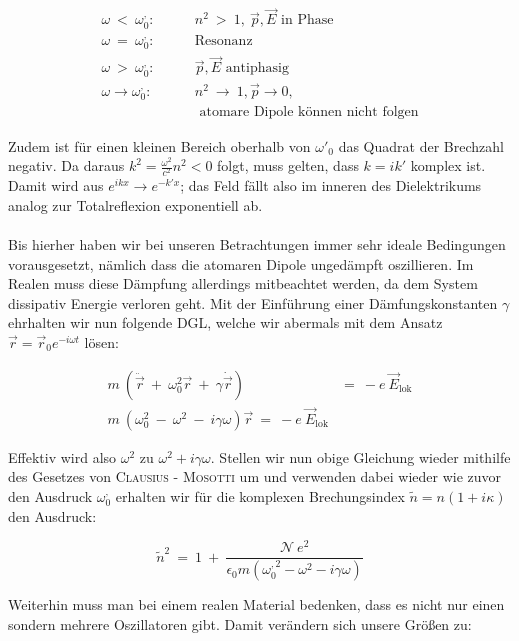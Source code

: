 \begin{align*}
\omega \ < \ \omega^{,}_0:& \qquad n^2 \ > \ 1,\ \vec{p},\vec{E} \text{ in Phase}\\
\omega \ = \ \omega^{,}_0:& \qquad \text{Resonanz}\\
\omega \ > \ \omega^{,}_0:& \qquad \vec{p},\vec{E} \text{ antiphasig}\\
\omega \rightarrow \omega^{,}_0:& \qquad n^2 \ \rightarrow \ 1, \vec{p} \rightarrow 0,\\
 & \qquad \text{ atomare Dipole können nicht  folgen}
\end{align*}

Zudem ist für einen kleinen Bereich oberhalb von $\omega'_0$ das Quadrat der Brechzahl negativ. Da daraus $k^2 = \frac{\omega^2}{c^2} n^2 < 0$ folgt, muss gelten, dass $k=ik'$ komplex ist. Damit wird aus $e^{ikx} \rightarrow e^{-k'x}$; das Feld fällt also im inneren des Dielektrikums analog zur Totalreflexion exponentiell ab.\\
\ \\
Bis hierher haben wir bei unseren Betrachtungen immer sehr ideale Bedingungen vorausgesetzt, nämlich dass die atomaren Dipole ungedämpft oszillieren. Im Realen muss diese Dämpfung allerdings mitbeachtet werden, da dem System dissipativ Energie verloren geht. Mit der Einführung einer Dämfungskonstanten $\gamma$ ehrhalten wir nun folgende DGL, welche wir abermals mit dem Ansatz $\vec{r}= \vec{r}_0 e^{-i\omega t}$ lösen:

\begin{align*}
m \ \left(\ddot{\vec{r}} \ + \ \omega_0^2 \vec{r} \ + \ \gamma \dot{\vec{r}}\right)  \ &= \ -e \ \vec{E}_{\text{lok}}\\
m \ \left(\omega_0^2 \ - \ \omega^2 \ - \ i \gamma\omega\right)\vec{r} \ = \ -e \ \vec{E}_{\text{lok}}
\end{align*}

Effektiv wird  also $\omega^2$ zu $\omega^2 + i\gamma\omega$. Stellen wir nun obige Gleichung wieder mithilfe des Gesetzes von \textsc{Clausius - Mosotti} um und verwenden dabei wieder wie zuvor den Ausdruck $\omega^{,}_0$ erhalten wir für die komplexen Brechungsindex $\tilde{n}= n (1+i\kappa)$ den Ausdruck:

\begin{equation*}
\tilde{n}^2 \ = \ 1 \ + \ \frac{\mathcal{N} \ e^2}{\epsilon_0 m \left(\omega^{,2}_0 - \omega^2 - i \gamma\omega\right)}
\end{equation*}

Weiterhin muss man bei einem realen Material bedenken, dass es nicht nur einen sondern mehrere Oszillatoren gibt. Damit verändern sich unsere Größen zu:

